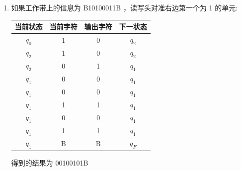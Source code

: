 \documentclass[../../main.tex]{subfiles}
\begin{document}
\begin{solution}
\begin{enumerate}
        \item 如果工作带上的信息为 B10100011B ，读写头对准右边第一个为 1 的单元:
              \begin{longtable}{cccc}
                  \hline
                  \textbf{当前状态} & \textbf{当前字符} & \textbf{输出字符} & \textbf{下一状态} \\
                  \hline
                  \(q_0\)       & 1             & 0             & \(q_2\)       \\
                  \(q_2\)       & 1             & 0             & \(q_2\)       \\
                  \(q_2\)       & 0             & 1             & \(q_1\)       \\
                  \(q_1\)       & 0             & 0             & \(q_1\)       \\
                  \(q_1\)       & 0             & 0             & \(q_1\)       \\
                  \(q_1\)       & 1             & 1             & \(q_1\)       \\
                  \(q_1\)       & 0             & 0             & \(q_1\)       \\
                  \(q_1\)       & 1             & 1             & \(q_1\)       \\
                  \(q_1\)       & B             & B             & \(q_F\)       \\
              \end{longtable}
              得到的结果为 00100101B

    \end{enumerate}
\end{solution}
\end{document}
